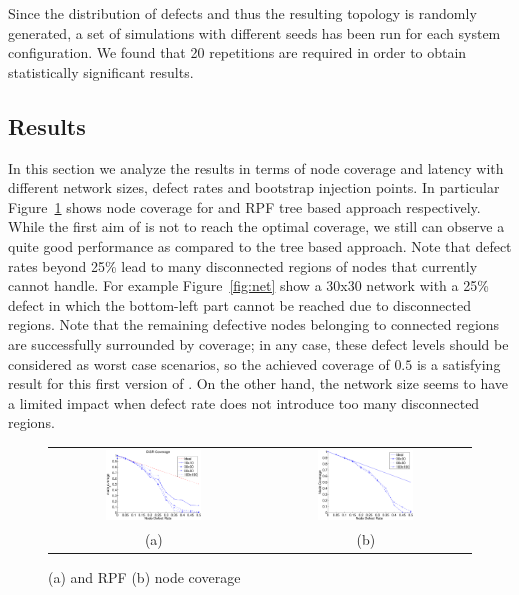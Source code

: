 Since the distribution of defects and thus the resulting topology is randomly
generated, a set of simulations with different seeds has been run
for each system configuration. We found that 20 repetitions are
required in order to obtain statistically significant results.


\subsection{Results}
\label{sec:results}

In this section we analyze the results in terms of node
coverage and latency with different network sizes, defect rates and
bootstrap injection points. In particular
Figure~\ref{fig:results_coverage} shows
node coverage for \disr{} and RPF tree based approach respectively. While
the first aim of \disr{} is not to reach the optimal coverage, we still
can observe a quite good performance as compared to the tree based
approach. Note that defect rates beyond 25\% lead to many disconnected
regions of nodes that \disr{} currently cannot handle.
For example Figure~\ref{fig:net} show a 30x30 network with a 25\%
defect in which the bottom-left part cannot be reached due to
disconnected regions. Note that the remaining defective nodes belonging to
connected regions are successfully surrounded by \disr{} coverage; in any
case, these defect levels should be considered as worst case scenarios, so the
achieved coverage of $0.5$ is a satisfying result for this first
version of \disr{}. On the other hand, the network size seems to have a
limited impact when defect rate does not introduce too many disconnected
regions. 
\begin{figure}
\centering
\begin{tabular}{cc}
\includegraphics[width=0.48\textwidth]{pictures/set1.eps} & 
\includegraphics[width=0.48\textwidth]{pictures/coverage.eps} \\
(a) & (b) 
\end{tabular}
\caption{\disr{} (a) and RPF (b) node coverage}
\label{fig:results_coverage}
\end{figure}

